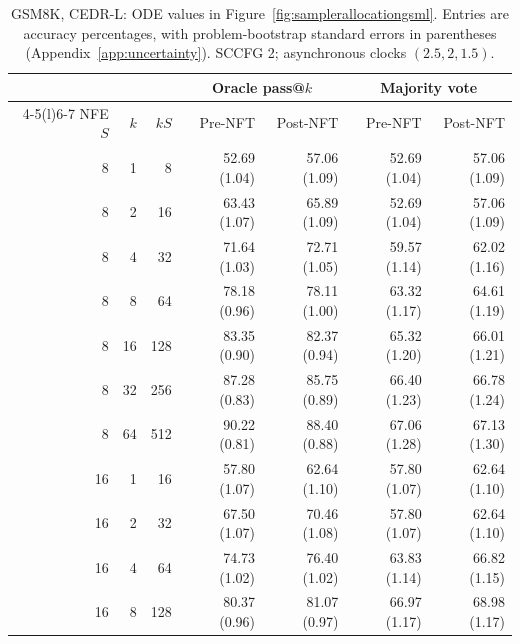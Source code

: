 \documentclass[11pt,letterpaper]{article}
\begin{document}
\begin{table}[p]
\centering\small
\setlength{\tabcolsep}{5pt}
\caption{GSM8K, CEDR-L: ODE values in Figure~\ref{fig:samplerallocationgsml}. Entries are accuracy percentages, with problem-bootstrap standard errors in parentheses (Appendix~\ref{app:uncertainty}). SCCFG 2; asynchronous clocks $(2.5,2,1.5)$.}
\label{tab:samplerbudgetgsmlode}
\begin{tabular}{@{}rrr rrrr@{}}
\toprule
& & & \multicolumn{2}{c}{Oracle pass@$k$} & \multicolumn{2}{c}{Majority vote} \\
\cmidrule(lr){4-5}\cmidrule(l){6-7}
NFE $S$ & $k$ & $kS$ & Pre-NFT & Post-NFT & Pre-NFT & Post-NFT \\
\midrule
8 & 1 & 8 & 52.69 {\scriptsize (1.04)} & 57.06 {\scriptsize (1.09)} & 52.69 {\scriptsize (1.04)} & 57.06 {\scriptsize (1.09)} \\
8 & 2 & 16 & 63.43 {\scriptsize (1.07)} & 65.89 {\scriptsize (1.09)} & 52.69 {\scriptsize (1.04)} & 57.06 {\scriptsize (1.09)} \\
8 & 4 & 32 & 71.64 {\scriptsize (1.03)} & 72.71 {\scriptsize (1.05)} & 59.57 {\scriptsize (1.14)} & 62.02 {\scriptsize (1.16)} \\
8 & 8 & 64 & 78.18 {\scriptsize (0.96)} & 78.11 {\scriptsize (1.00)} & 63.32 {\scriptsize (1.17)} & 64.61 {\scriptsize (1.19)} \\
8 & 16 & 128 & 83.35 {\scriptsize (0.90)} & 82.37 {\scriptsize (0.94)} & 65.32 {\scriptsize (1.20)} & 66.01 {\scriptsize (1.21)} \\
8 & 32 & 256 & 87.28 {\scriptsize (0.83)} & 85.75 {\scriptsize (0.89)} & 66.40 {\scriptsize (1.23)} & 66.78 {\scriptsize (1.24)} \\
8 & 64 & 512 & 90.22 {\scriptsize (0.81)} & 88.40 {\scriptsize (0.88)} & 67.06 {\scriptsize (1.28)} & 67.13 {\scriptsize (1.30)} \\
\midrule
16 & 1 & 16 & 57.80 {\scriptsize (1.07)} & 62.64 {\scriptsize (1.10)} & 57.80 {\scriptsize (1.07)} & 62.64 {\scriptsize (1.10)} \\
16 & 2 & 32 & 67.50 {\scriptsize (1.07)} & 70.46 {\scriptsize (1.08)} & 57.80 {\scriptsize (1.07)} & 62.64 {\scriptsize (1.10)} \\
16 & 4 & 64 & 74.73 {\scriptsize (1.02)} & 76.40 {\scriptsize (1.02)} & 63.83 {\scriptsize (1.14)} & 66.82 {\scriptsize (1.15)} \\
16 & 8 & 128 & 80.37 {\scriptsize (0.96)} & 81.07 {\scriptsize (0.97)} & 66.97 {\scriptsize (1.17)} & 68.98 {\scriptsize (1.17)} \\

\end{tabular}
\end{table}
\end{document}
